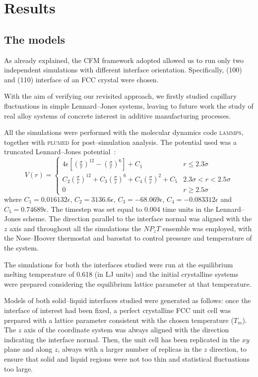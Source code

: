 \section{Results}
\label{sec:results}

\subsection{The models}
As already explained, the CFM framework adopted allowed us to run only two independent simulations with different interface orientation. Specifically, (100) and (110) interface of an FCC crystal were chosen.

With the aim of verifying our revisited approach, we firstly studied capillary fluctuations in simple Lennard--Jones systems, leaving to future work the study of real alloy systems of concrete interest in additive manufacturing processes.

All the simulations were performed with the molecular dynamics code \textsc{lammps}, together with \textsc{plumed} for post--simulation analysis. The potential used was a truncated Lennard--Jones potential~\cite{Cheng2015}:
\begin{equation}
    \label{eqn:LJ}
    V(r)=
    \begin{cases}
        4\epsilon\left[ \left(\frac{\sigma}{r}\right)^{12} - \left( \frac{\sigma}{r}\right)^6 \right] + C_1 & r\le 2.3\sigma \\
        C_2 \left(\frac{\sigma}{r}\right)^{12}+ C_3 \left(\frac{\sigma}{r}\right)^6 + C_4 \left(\frac{\sigma}{r}\right)^2 + C_5 & 2.3\sigma < r < 2.5\sigma \\
        0 & r\ge 2.5\sigma
    \end{cases}
\end{equation}
where $C_1=0.016132\epsilon$, $C_2=3136.6\epsilon$, $C_3=-68.069\epsilon$, $C_4=-0.083312\epsilon$ and $C_5=0.74689\epsilon$. The timestep was set equal to 0.004 time units in the Lennard--Jones scheme. The direction parallel to the interface normal was aligned with the $z$ axis and throughout all the simulations the $NP_zT$ ensemble was employed, with the Nose--Hoover thermostat and barostat to control pressure and temperature of the system.

The simulations for both the interfaces studied were run at the equilibrium melting temperature of 0.618 (in LJ units) and the initial crystalline systems were prepared considering the equilibrium lattice parameter at that temperature.

Models of both solid--liquid interfaces studied were generated as follows: once the interface of interest had been fixed, a perfect crystalline FCC unit cell was prepared with a lattice parameter consistent with the chosen temperature ($T_m$). The $z$ axis of the coordinate system was always aligned with the direction indicating the interface normal. Then, the unit cell has been replicated in the $xy$ plane and along $z$, always with a larger number of replicas in the $z$ direction, to ensure that solid and liquid regions were not too thin and statistical fluctuations too large.


